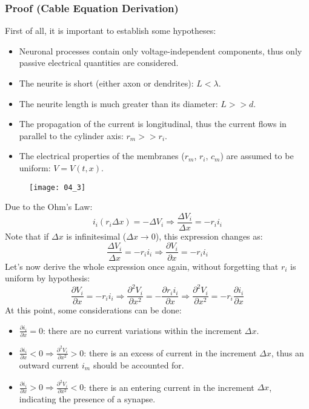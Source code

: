 \subsubsection{Proof (Cable Equation Derivation)}
First of all, it is important to establish some hypotheses:
\begin{itemize}
    \item Neuronal processes contain only voltage-independent components, thus only passive
          electrical quantities are considered.
    \item The neurite is short (either axon or dendrites): \(L<\lambda\).
    \item The neurite length is much greater than its diameter: \(L>>d\).
    \item The propagation of the current is longitudinal, thus the current flows in parallel
          to the cylinder axis: \(r_{m}>>r_{i}\).
    \item The electrical properties of the membranes (\(r_{m}\), \(r_{i}\), \(c_{m}\)) are
          assumed to be uniform: \(V=V(t,x)\).
\end{itemize}
\begin{figure}[H]
    \texttt{[image: 04\_3]}
    \centering
\end{figure}
Due to the Ohm's Law:
\begin{equation*}
    i_{i}(r_{i}\Delta{x})=-\Delta{V_{i}}\Rightarrow\frac{\Delta{V_{i}}}{\Delta{x}}=-r_{i}i_{i}
\end{equation*}
Note that if \(\Delta{x}\) is infinitesimal (\(\Delta{x}\to{0}\)), this expression changes as:
\begin{equation*}
    \frac{\Delta{V_{i}}}{\Delta{x}}=-r_{i}i_{i}\Rightarrow\frac{\partial{V_{i}}}{\partial{x}}=-r_{i}i_{i}
\end{equation*}
Let's now derive the whole expression once again, without forgetting that \(r_{i}\) is uniform
by hypothesis:
\begin{equation*}
    \frac{\partial{V_{i}}}{\partial{x}}=-r_{i}i_{i}
    \Rightarrow
    \frac{\partial^{2}V_{i}}{\partial{x^{2}}}=-\frac{\partial{r_{i}i_{i}}}{\partial{x}}
    \Rightarrow
    \frac{\partial^{2}V_{i}}{\partial{x^{2}}}=-r_{i}\frac{\partial{i_{i}}}{\partial{x}}
\end{equation*}
At this point, some considerations can be done:
\begin{itemize}
    \item \(\frac{\partial{i_{i}}}{\partial{x}}=0\): there are no current variations
          within the increment \(\Delta{x}\).
    \item \(\frac{\partial{i_{i}}}{\partial{x}}<0\Rightarrow\frac{\partial^{2}V_{i}}{\partial{x^{2}}}>0\):
          there is an excess of current in the increment \(\Delta{x}\), thus an outward current \(i_{m}\) should
          be accounted for.
    \item \(\frac{\partial{i_{i}}}{\partial{x}}>0\Rightarrow\frac{\partial^{2}V_{i}}{\partial{x^{2}}}<0\):
          there is an entering current in the increment \(\Delta{x}\), indicating the presence of a synapse.
\end{itemize}
